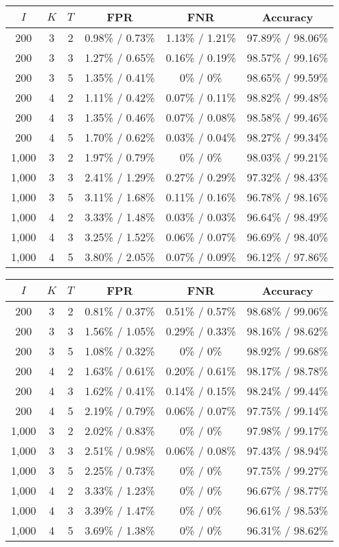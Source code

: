 \begin{tabular}{cccccc}
\hline
$I$ & $K$ & $T$ & FPR & FNR & Accuracy \\
\hline
200 & 3 & 2 & 0.98\% / 0.73\% & 1.13\% / 1.21\% & 97.89\% / 98.06\% \\
200 & 3 & 3 & 1.27\% / 0.65\% & 0.16\% / 0.19\% & 98.57\% / 99.16\% \\
200 & 3 & 5 & 1.35\% / 0.41\% & 0\% / 0\% & 98.65\% / 99.59\% \\
200 & 4 & 2 & 1.11\% / 0.42\% & 0.07\% / 0.11\% & 98.82\% / 99.48\% \\
200 & 4 & 3 & 1.35\% / 0.46\% & 0.07\% / 0.08\% & 98.58\% / 99.46\% \\
200 & 4 & 5 & 1.70\% / 0.62\% & 0.03\% / 0.04\% & 98.27\% / 99.34\% \\
1,000 & 3 & 2 & 1.97\% / 0.79\% & 0\% / 0\% & 98.03\% / 99.21\% \\
1,000 & 3 & 3 & 2.41\% / 1.29\% & 0.27\% / 0.29\% & 97.32\% / 98.43\% \\
1,000 & 3 & 5 & 3.11\% / 1.68\% & 0.11\% / 0.16\% & 96.78\% / 98.16\% \\
1,000 & 4 & 2 & 3.33\% / 1.48\% & 0.03\% / 0.03\% & 96.64\% / 98.49\% \\
1,000 & 4 & 3 & 3.25\% / 1.52\% & 0.06\% / 0.07\% & 96.69\% / 98.40\% \\
1,000 & 4 & 5 & 3.80\% / 2.05\% & 0.07\% / 0.09\% & 96.12\% / 97.86\% \\
\hline
\end{tabular}

\begin{tabular}{cccccc}
\hline
$I$ & $K$ & $T$ & FPR & FNR & Accuracy \\
\hline
200 & 3 & 2 & 0.81\% / 0.37\% & 0.51\% / 0.57\% & 98.68\% / 99.06\% \\
200 & 3 & 3 & 1.56\% / 1.05\% & 0.29\% / 0.33\% & 98.16\% / 98.62\% \\
200 & 3 & 5 & 1.08\% / 0.32\% & 0\% / 0\% & 98.92\% / 99.68\% \\
200 & 4 & 2 & 1.63\% / 0.61\% & 0.20\% / 0.61\% & 98.17\% / 98.78\% \\
200 & 4 & 3 & 1.62\% / 0.41\% & 0.14\% / 0.15\% & 98.24\% / 99.44\% \\
200 & 4 & 5 & 2.19\% / 0.79\% & 0.06\% / 0.07\% & 97.75\% / 99.14\% \\
1,000 & 3 & 2 & 2.02\% / 0.83\% & 0\% / 0\% & 97.98\% / 99.17\% \\
1,000 & 3 & 3 & 2.51\% / 0.98\% & 0.06\% / 0.08\% & 97.43\% / 98.94\% \\
1,000 & 3 & 5 & 2.25\% / 0.73\% & 0\% / 0\% & 97.75\% / 99.27\% \\
1,000 & 4 & 2 & 3.33\% / 1.23\% & 0\% / 0\% & 96.67\% / 98.77\% \\
1,000 & 4 & 3 & 3.39\% / 1.47\% & 0\% / 0\% & 96.61\% / 98.53\% \\
1,000 & 4 & 5 & 3.69\% / 1.38\% & 0\% / 0\% & 96.31\% / 98.62\% \\
\hline
\end{tabular}

